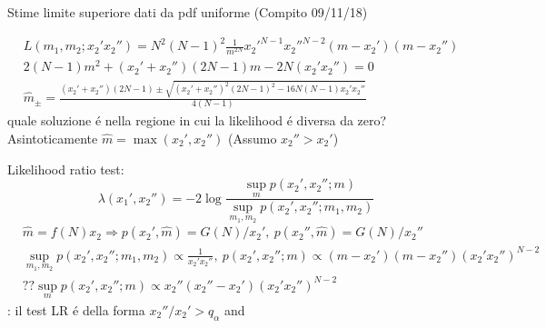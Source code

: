 \begin{wordonframe}{Stime limite superiore dati da pdf uniforme (Compito 09/11/18)}
\begin{block}{}
\begin{align*}
&L(m_1,m_2;x_2'x_2'')=N^2(N-1)^2\frac{1}{m^{2N}}{x_2'}^{N-1}{x_2''}^{N-2}(m-x_2')(m-x_2'')\\
&2(N-1)m^2+(x_2'+x_2'')(2N-1)m-2N(x_2'x_2'')=0\\
&\hat{m}_{\pm}=\frac{(x_2'+x_2'')(2N-1)\pm\sqrt{(x_2'+x_2'')^2(2N-1)^2-16N(N-1)x_2'x_2''}}{4(N-1)}
\end{align*}
quale soluzione \'e nella regione in cui la likelihood \'e diversa da zero? Asintoticamente $\hat{m}=\max{(x_2',x_2'')}$ (Assumo $x_2''>x_2'$)
\end{block}
\begin{block}{}
Likelihood ratio test:
\begin{equation*}
\lambda(x_1',x_2'')=-2\log{\frac{\sup_m{p(x_2',x_2'';m)}}{\sup_{m_1,m_2}{p(x_2',x_2'';m_1,m_2)}}}
\end{equation*}
\begin{align*}
&\hat{m}=f(N)x_2\Rightarrow p(x_2',\hat{m})=G(N)/x_2',\ p(x_2'',\hat{m})=G(N)/x_2''\\
&\sup_{m_1,m_2}{p(x_2',x_2'';m_1,m_2)}\propto\frac{1}{x_2'x_2''},\ p(x_2',x_2'';m)\propto(m-x_2')(m-x_2'')(x_2'x_2'')^{N-2}\\
&??\sup_{m}p(x_2',x_2'';m)\propto x_2''(x_2''-x_2')(x_2'x_2'')^{N-2}
\end{align*}
: il test LR \'e della forma $x_2''/x_2'>q_{\alpha}$
 and 
\end{block}
\end{wordonframe}

